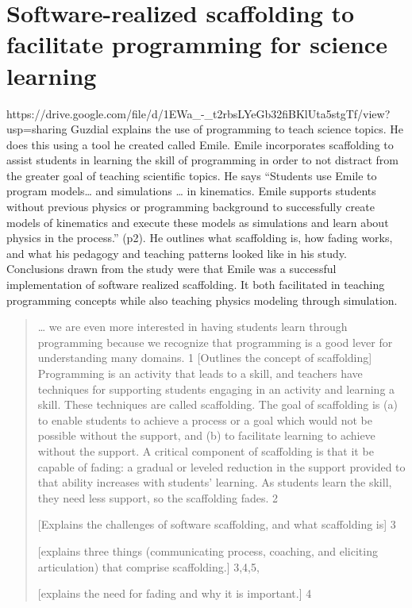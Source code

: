 \documentclass[12pt]{extarticle}
\begin{document}
\section{Software-realized scaffolding to facilitate programming for science learning}
\author{Guzdial, Mark}
https://drive.google.com/file/d/1EWa_-_t2rbsLYeGb32fiBKlUta5stgTf/view?usp=sharing 
Guzdial explains the use of programming to teach science topics. He does this using a tool he created called Emile. Emile incorporates scaffolding to assist students in learning the skill of programming in order to not distract from the greater goal of teaching scientific topics. He says “Students use Emile to program models… and simulations … in kinematics. Emile supports students without previous physics or programming background to successfully create models of kinematics and execute these models as simulations and learn about physics in the process.” (p2). He outlines what scaffolding is, how fading works, and what his pedagogy and teaching patterns looked like in his study. Conclusions drawn from the study were that Emile was a successful implementation of software realized scaffolding. It both facilitated in teaching programming concepts while also teaching physics modeling through simulation.
\begin{quote}
… we are even more interested in having students learn through programming because we recognize that programming is a good lever for understanding many domains. 	1
[Outlines the concept of scaffolding] Programming is an activity that leads to a skill, and teachers have techniques for supporting students engaging in an activity and learning a skill. These techniques are called scaffolding. The goal of scaffolding is (a) to enable students to achieve a process or a goal which would not be possible without the support, and (b) to facilitate learning to achieve without the support. A critical component of scaffolding is that it be capable of fading: a gradual or leveled reduction in the support provided to that ability increases with students’ learning. As students learn the skill, they need less support, so the scaffolding fades. 	2

[Explains the challenges of software scaffolding, and what scaffolding is] 	3

[explains three things (communicating process, coaching, and eliciting articulation) that comprise scaffolding.] 	3,4,5,

[explains the need for fading and why it is important.] 4
\end{quote}
\end{document}
